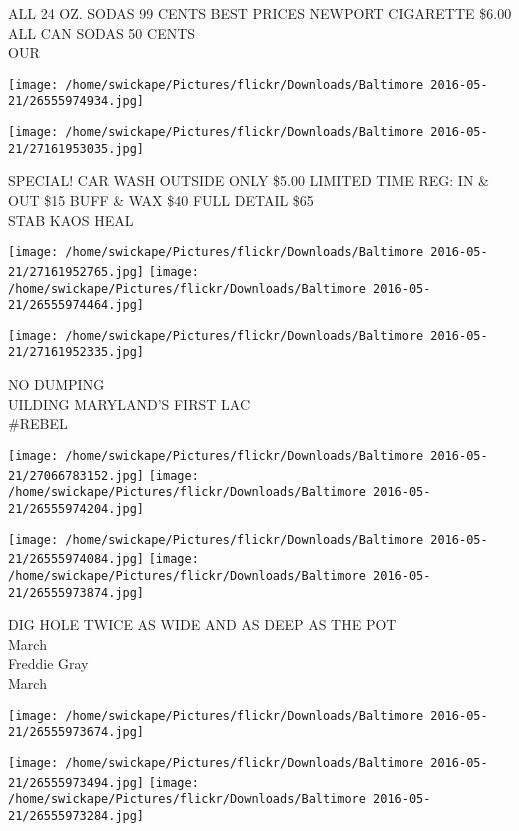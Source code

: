 \documentclass[10pt,letterpaper]{article}
\begin{document}
ALL 24 OZ. SODAS 99 CENTS BEST PRICES NEWPORT CIGARETTE \$6.00 ALL CAN SODAS 50 CENTS\\
OUR
\pagebreak

\texttt{[image: /home/swickape/Pictures/flickr/Downloads/Baltimore 2016-05-21/26555974934.jpg]}

\vspace{0.25in}
\texttt{[image: /home/swickape/Pictures/flickr/Downloads/Baltimore 2016-05-21/27161953035.jpg]}

SPECIAL!  CAR WASH OUTSIDE ONLY \$5.00 LIMITED TIME REG: IN \& OUT \$15 BUFF \& WAX \$40 FULL DETAIL \$65\\
STAB KAOS HEAL
\pagebreak

\texttt{[image: /home/swickape/Pictures/flickr/Downloads/Baltimore 2016-05-21/27161952765.jpg]}
\texttt{[image: /home/swickape/Pictures/flickr/Downloads/Baltimore 2016-05-21/26555974464.jpg]}

\vspace{0.25in}
\texttt{[image: /home/swickape/Pictures/flickr/Downloads/Baltimore 2016-05-21/27161952335.jpg]}

NO DUMPING\\
UILDING MARYLAND'S FIRST LAC\\
\#REBEL
\pagebreak

\texttt{[image: /home/swickape/Pictures/flickr/Downloads/Baltimore 2016-05-21/27066783152.jpg]}
\texttt{[image: /home/swickape/Pictures/flickr/Downloads/Baltimore 2016-05-21/26555974204.jpg]}

\texttt{[image: /home/swickape/Pictures/flickr/Downloads/Baltimore 2016-05-21/26555974084.jpg]}
\texttt{[image: /home/swickape/Pictures/flickr/Downloads/Baltimore 2016-05-21/26555973874.jpg]}

DIG HOLE TWICE AS WIDE AND AS DEEP AS THE POT\\
March\\
Freddie Gray\\
March
\pagebreak

\texttt{[image: /home/swickape/Pictures/flickr/Downloads/Baltimore 2016-05-21/26555973674.jpg]}

\vspace{0.25in}
\texttt{[image: /home/swickape/Pictures/flickr/Downloads/Baltimore 2016-05-21/26555973494.jpg]}
\texttt{[image: /home/swickape/Pictures/flickr/Downloads/Baltimore 2016-05-21/26555973284.jpg]}
\end{document}
